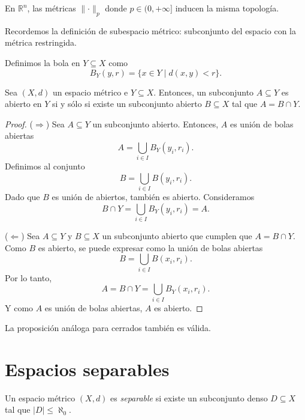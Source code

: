 \begin{example}
	En $\mathbb{R}^n$, las métricas $\lVert \cdot \rVert_p$ donde $p \in (0, + \infty]$ inducen la misma topología.
\end{example}

Recordemos la definición de subespacio métrico: subconjunto del espacio con la métrica restringida.

\begin{remark}
	Definimos la bola en $Y \subseteq X$ como
	$$
		B_Y (y, r) = \{ x \in Y \mid d(x, y) < r\}.
	$$
\end{remark}

\begin{proposition}
	Sea $(X, d)$ un espacio métrico e $Y \subseteq X$. Entonces, un subconjunto $A \subseteq Y$ es abierto en $Y$ si y sólo si existe un subconjunto abierto $B \subseteq X$ tal que $A = B \cap Y$.
\end{proposition}

\begin{proof}
	($\Rightarrow$) Sea $A \subseteq Y$ un subconjunto abierto. Entonces, $A$ es unión de bolas abiertas
	$$
		A = \bigcup_{i \in I} B_Y (y_i, r_i).
	$$
	Definimos al conjunto
	$$
		B = \bigcup_{i \in I} B (y_i, r_i).
	$$
	Dado que $B$ es unión de abiertos,  también es abierto. Consideramos
	$$
		B \cap Y = \bigcup_{i \in I} B_Y (y_i, r_i) = A.
	$$

	($\Leftarrow$) Sea $A \subseteq Y$ y $B \subseteq X$ un subconjunto abierto que cumplen que $A = B \cap Y$. Como $B$ es abierto, se puede expresar como la unión de bolas abiertas
	$$
		B = \bigcup_{i \in I} B(x_i, r_i).
	$$
	Por lo tanto,
	$$
		A = B \cap Y = \bigcup_{i \in I} B_Y (x_i, r_i).
	$$
	Y como $A$ es unión de bolas abiertas, $A$ es abierto.
\end{proof}

\begin{remark}
	La proposición análoga para cerrados también es válida.
\end{remark}

\section{Espacios separables}

\begin{definition}
	Un espacio métrico $(X, d)$ es \emph{separable} si existe un subconjunto denso $D \subseteq X$ tal que $\left| D \right| \leq \aleph_0$.
\end{definition}

